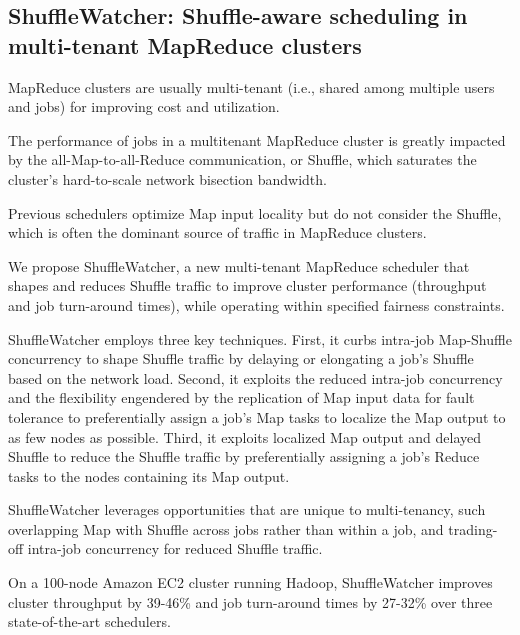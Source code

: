 \documentclass[a4paper,11pt]{article}
\begin{document}
\subsection*{ShuffleWatcher: Shuffle-aware scheduling in multi-tenant MapReduce clusters}
{\color{cyan} {\color{magenta}}
	
MapReduce clusters are usually multi-tenant (i.e., shared among multiple users and jobs) 
for improving cost and utilization. 

The performance of jobs in a multitenant MapReduce cluster is greatly impacted by the 
all-Map-to-all-Reduce communication, or Shuffle, 
which saturates the cluster’s hard-to-scale network bisection bandwidth. 

Previous schedulers optimize Map input locality but do not consider the Shuffle, 
which is often the dominant source of traffic in MapReduce clusters.

We propose 
ShuffleWatcher\cite{shufflewatcher}, 
a new multi-tenant MapReduce scheduler that shapes and reduces Shuffle
traffic to improve cluster performance (throughput and job turn-around times), 
while operating within specified fairness constraints. 

ShuffleWatcher employs three key techniques. 
First, 
it curbs intra-job Map-Shuffle concurrency to shape Shuffle traffic 
by delaying or elongating a job's Shuffle based on the network load. 
Second, 
it exploits the reduced intra-job concurrency and the flexibility engendered 
by the replication of Map input data for fault tolerance 
to preferentially assign a job's Map tasks to localize the Map output to as few nodes as possible.
Third, 
it exploits localized Map output and delayed Shuffle 
to reduce the Shuffle traffic by preferentially assigning a job's Reduce tasks to the nodes containing its Map output. 

ShuffleWatcher leverages opportunities that are unique to multi-tenancy, such
overlapping Map with Shuffle across jobs rather than within a job, and trading-off intra-job concurrency for
reduced Shuffle traffic. 

On a 100-node Amazon EC2 cluster running Hadoop, 
ShuffleWatcher improves cluster throughput 
by 39-46\% and job turn-around times by 27-32\% 
over three state-of-the-art schedulers.	

}
\end{document}

